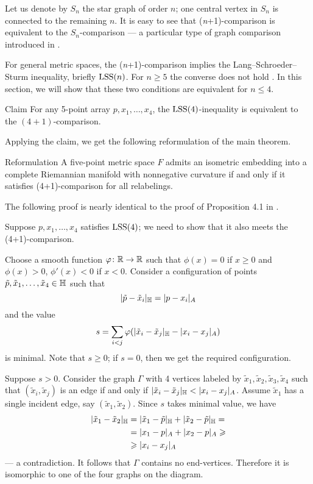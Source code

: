 \documentclass{article}
\begin{document}
Let us denote by $S_n$ the star graph of order $n$;
one central vertex in $S_n$ is connected to the remaining $n$.
It is easy to see that (\textit{n}+1)-comparison is equivalent to the $S_n$-comparison --- a particular type of graph comparison introduced in \cite{lebedeva-petrunin-zolotov}.

For general metric spaces, the (\textit{n}+1)-comparison implies the Lang--Schroeder--Sturm inequality,  briefly $\mathrm{LSS}(n)$.
For $n\ge 5$ the converse does not hold \cite[Section 8]{lebedeva-petrunin-zolotov}.
In this section, we will show that these two conditions are equivalent for $n\le 4$.

\begin{thm}{Claim}\label{clm:(4+1)=LSS(4)}
For any 5-point array $p,x_1,\dots,x_4$, the
$\mathrm{LSS}(4)$-inequality is equivalent to the $(4+1)$-comparison.
\end{thm}

Applying the claim, we get the following reformulation of the main theorem.

\begin{thm}{Reformulation}\label{thm:main-(4+1)}
A five-point metric space $F$ admits an isometric embedding into a complete Riemannian manifold with nonnegative curvature
if and only if it satisfies (4+1)-comparison for all relabelings.
\end{thm}

The following proof is nearly identical to the proof of Proposition 4.1 in \cite{lebedeva-petrunin-zolotov}.

Suppose $p,x_1,\dots,x_4$ satisfies $\mathrm{LSS}(4)$;
we need to show that it also meets the (4+1)-comparison.

Choose a smooth function $\varphi\colon\mathbb{R}\to \mathbb{R}$ such that $\phi(x)=0$ if $x\ge0$ and $\phi(x)>0$, $\phi'(x)<0$ if $x<0$.
Consider a configuration of points $\tilde p,\tilde x_1,\dots,\tilde x_4\in \mathbb H$ such that 
\[
|\tilde p-\tilde x_i|_{\mathbb H}=|p-x_i|_{A}
\]
and the  value
\[
s=\sum_{i<j}\varphi(|\tilde x_i-\tilde x_j|_{\mathbb H}- |x_i-x_j|_{A})
\]
is minimal.
Note that $s\ge0$;
if $s=0$, then we get the required configuration.

Suppose $s>0$.
Consider the graph $\Gamma$ with 4 vertices labeled by $\tilde x_1,\tilde x_2,\tilde x_3,\tilde x_4$ such that 
$(\tilde x_i,\tilde x_j)$ is an edge if and only if $|\tilde x_i-\tilde x_j|_{\HH}<|x_i-x_j|_{A}$.
Assume $\tilde x_1$ has a single incident edge, say $(\tilde x_1,\tilde x_2)$.
Since $s$ takes minimal value, we have 
\begin{align*}
|\tilde x_1-\tilde x_2|_{\mathbb H}&=|\tilde x_1-\tilde p|_{\mathbb H}+|\tilde x_2-\tilde p|_{\mathbb H}=
\\
&=| x_1- p|_{A}+| x_2- p|_{A}\geqslant
\\
&\geqslant |x_i-x_j|_{A}
\end{align*}
--- a contradiction.
It follows that $\Gamma$ contains no end-vertices.
Therefore it is isomorphic to one of the four graphs on the diagram.
\end{document}
